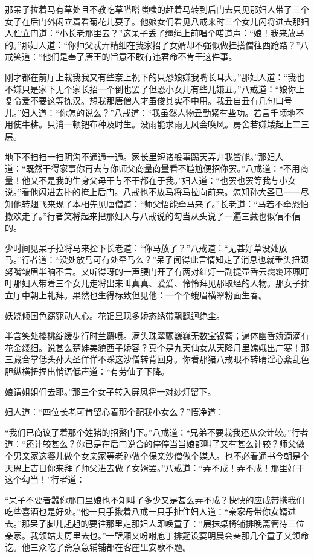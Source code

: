 \documentclass[12pt,UTF8]{ctexbook}
\begin{document}
{那呆子拉着马有草处且不教吃草嗒嗒嗤嗤的赶着马转到后门去只见那妇人带了三个女子在后门外闲立着看菊花儿耍子。他娘女们看见八戒来时三个女儿闪将进去那妇人伫立门道：“小长老那里去？”这呆子丢了缰绳上前唱个喏道声：“娘！我来放马的。”那妇人道：“你师父忒弄精细在我家招了女婿却不强似做挂搭僧往西跄路？”八戒笑道：“他们是奉了唐王的旨意不敢有违君命不肯干这件事。

刚才都在前厅上栽我我又有些奈上祝下的只恐娘嫌我嘴长耳大。”那妇人道：“我也不嫌只是家下无个家长招一个倒也罢了但恐小女儿有些儿嫌丑。”八戒道：“娘你上复令爱不要这等拣汉。想我那唐僧人才虽俊其实不中用。我丑自丑有几句口号儿。”妇人道：“你怎的说么？”八戒道：“我虽然人物丑勤紧有些功。若言千顷地不用使牛耕。只消一顿钯布种及时生。没雨能求雨无风会唤风。房舍若嫌矮起上二三层。

地下不扫扫一扫阴沟不通通一通。家长里短诸般事踢天弄井我皆能。”那妇人道：“既然干得家事你再去与你师父商量商量看不尴尬便招你罢。”八戒道：“不用商量！他又不是我的生身父母干与不干都在于我。”妇人道：“也罢也罢等我与小女说。”看他闪进去扑的掩上后门。八戒也不放马将马拉向前来。怎知孙大圣已一一尽知他转翅飞来现了本相先见唐僧道：“师父悟能牵马来了。”长老道：“马若不牵恐怕撒欢走了。”行者笑将起来把那妇人与八戒说的勾当从头说了一遍三藏也似信不信的。

少时间见呆子拉将马来拴下长老道：“你马放了？”八戒道：“无甚好草没处放马。”行者道：“没处放马可有处牵马么？”呆子闻得此言情知走了消息也就垂头扭颈努嘴皱眉半晌不言。又听得呀的一声腰门开了有两对红灯一副提壶香云霭霭环珮叮叮那妇人带着三个女儿走将出来叫真真、爱爱、怜怜拜见那取经的人物。那女子排立厅中朝上礼拜。果然也生得标致但见他：一个个蛾眉横翠粉面生春。

妖娆倾国色窈窕动人心。花钿显现多娇态绣带飘飖迥绝尘。

半含笑处樱桃绽缓步行时兰麝喷。满头珠翠颤巍巍无数宝钗簪；遍体幽香娇滴滴有花金缕细。说甚么楚娃美貌西子娇容？真个是九天仙女从天降月里嫦娥出广寒！那三藏合掌低头孙大圣佯佯不睬这沙僧转背回身。你看那猪八戒眼不转睛淫心紊乱色胆纵横扭捏出悄语低声道：“有劳仙子下降。

娘请姐姐们去耶。”那三个女子转入屏风将一对纱灯留下。

妇人道：“四位长老可肯留心着那个配我小女么？”悟净道：

“我们已商议了着那个姓猪的招赘门下。”八戒道：“兄弟不要栽我还从众计较。”行者道：“还计较甚么？你已是在后门说合的停停当当娘都叫了又有甚么计较？师父做个男亲家这婆儿做个女亲家等老孙做个保亲沙僧做个媒人。也不必看通书今朝是个天恩上吉日你来拜了师父进去做了女婿罢。”八戒道：“弄不成！弄不成！那里好干这个勾当！”行者道：

“呆子不要者嚣你那口里娘也不知叫了多少又是甚么弄不成？快快的应成带携我们吃些喜酒也是好处。”他一只手揪着八戒一只手扯住妇人道：“亲家母带你女婿进去。”那呆子脚儿趄趄的要往那里走那妇人即唤童子：“展抹桌椅铺排晚斋管待三位亲家。我领姑夫房里去也。”一壁厢又吩咐庖丁排筵设宴明晨会亲那几个童子又领命讫。他三众吃了斋急急铺铺都在客座里安歇不题。

}
\end{document}
